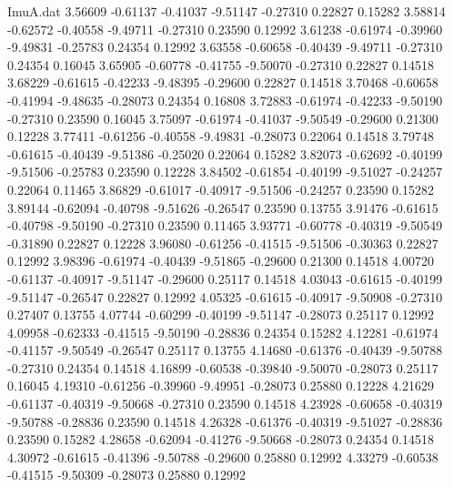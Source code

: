 \begin{filecontents}{ImuA.dat}
   3.56609   -0.61137   -0.41037   -9.51147   -0.27310    0.22827    0.15282
   3.58814   -0.62572   -0.40558   -9.49711   -0.27310    0.23590    0.12992
   3.61238   -0.61974   -0.39960   -9.49831   -0.25783    0.24354    0.12992
   3.63558   -0.60658   -0.40439   -9.49711   -0.27310    0.24354    0.16045
   3.65905   -0.60778   -0.41755   -9.50070   -0.27310    0.22827    0.14518
   3.68229   -0.61615   -0.42233   -9.48395   -0.29600    0.22827    0.14518
   3.70468   -0.60658   -0.41994   -9.48635   -0.28073    0.24354    0.16808
   3.72883   -0.61974   -0.42233   -9.50190   -0.27310    0.23590    0.16045
   3.75097   -0.61974   -0.41037   -9.50549   -0.29600    0.21300    0.12228
   3.77411   -0.61256   -0.40558   -9.49831   -0.28073    0.22064    0.14518
   3.79748   -0.61615   -0.40439   -9.51386   -0.25020    0.22064    0.15282
   3.82073   -0.62692   -0.40199   -9.51506   -0.25783    0.23590    0.12228
   3.84502   -0.61854   -0.40199   -9.51027   -0.24257    0.22064    0.11465
   3.86829   -0.61017   -0.40917   -9.51506   -0.24257    0.23590    0.15282
   3.89144   -0.62094   -0.40798   -9.51626   -0.26547    0.23590    0.13755
   3.91476   -0.61615   -0.40798   -9.50190   -0.27310    0.23590    0.11465
   3.93771   -0.60778   -0.40319   -9.50549   -0.31890    0.22827    0.12228
   3.96080   -0.61256   -0.41515   -9.51506   -0.30363    0.22827    0.12992
   3.98396   -0.61974   -0.40439   -9.51865   -0.29600    0.21300    0.14518
   4.00720   -0.61137   -0.40917   -9.51147   -0.29600    0.25117    0.14518
   4.03043   -0.61615   -0.40199   -9.51147   -0.26547    0.22827    0.12992
   4.05325   -0.61615   -0.40917   -9.50908   -0.27310    0.27407    0.13755
   4.07744   -0.60299   -0.40199   -9.51147   -0.28073    0.25117    0.12992
   4.09958   -0.62333   -0.41515   -9.50190   -0.28836    0.24354    0.15282
   4.12281   -0.61974   -0.41157   -9.50549   -0.26547    0.25117    0.13755
   4.14680   -0.61376   -0.40439   -9.50788   -0.27310    0.24354    0.14518
   4.16899   -0.60538   -0.39840   -9.50070   -0.28073    0.25117    0.16045
   4.19310   -0.61256   -0.39960   -9.49951   -0.28073    0.25880    0.12228
   4.21629   -0.61137   -0.40319   -9.50668   -0.27310    0.23590    0.14518
   4.23928   -0.60658   -0.40319   -9.50788   -0.28836    0.23590    0.14518
   4.26328   -0.61376   -0.40319   -9.51027   -0.28836    0.23590    0.15282
   4.28658   -0.62094   -0.41276   -9.50668   -0.28073    0.24354    0.14518
   4.30972   -0.61615   -0.41396   -9.50788   -0.29600    0.25880    0.12992
   4.33279   -0.60538   -0.41515   -9.50309   -0.28073    0.25880    0.12992

\end{filecontents}
